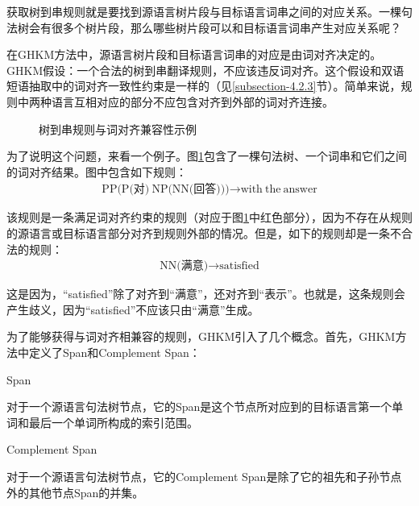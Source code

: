 \parinterval 获取树到串规则就是要找到源语言树片段与目标语言词串之间的对应关系。一棵句法树会有很多个树片段，那么哪些树片段可以和目标语言词串产生对应关系呢？

\parinterval 在GHKM方法中，源语言树片段和目标语言词串的对应是由词对齐决定的。GHKM假设：一个合法的树到串翻译规则，不应该违反词对齐。这个假设和双语短语抽取中的词对齐一致性约束是一样的（见\ref{subsection-4.2.3}节）。简单来说，规则中两种语言互相对应的部分不应包含对齐到外部的词对齐连接。

\begin{figure}[htp]
\centering

\caption{树到串规则与词对齐兼容性示例}
\label{fig:4-50}
\end{figure}

\parinterval 为了说明这个问题，来看一个例子。图\ref{fig:4-50}包含了一棵句法树、一个词串和它们之间的词对齐结果。图中包含如下规则：
\begin{eqnarray}
\textrm{PP(P(对)}\ \textrm{NP(NN(回答)))} \rightarrow \textrm{with}\ \textrm{the}\ \textrm{answer} \nonumber
\end{eqnarray}

\parinterval 该规则是一条满足词对齐约束的规则（对应于图\ref{fig:4-50}中红色部分），因为不存在从规则的源语言或目标语言部分对齐到规则外部的情况。但是，如下的规则却是一条不合法的规则：
\begin{eqnarray}
\textrm{NN(满意)} \rightarrow \textrm{satisfied} \nonumber
\end{eqnarray}

\parinterval 这是因为，``satisfied''除了对齐到``满意''，还对齐到``表示''。也就是，这条规则会产生歧义，因为``satisfied''不应该只由``满意''生成。

\parinterval 为了能够获得与词对齐相兼容的规则，GHKM引入了几个概念。首先，GHKM方法中定义了Span和Complement Span：

\vspace{0.5em}
\begin{definition} Span

{\small
对于一个源语言句法树节点，它的Span是这个节点所对应到的目标语言第一个单词和最后一个单词所构成的索引范围。
}
\end{definition}

\vspace{0.5em}
\begin{definition} Complement Span

{\small
对于一个源语言句法树节点，它的Complement Span是除了它的祖先和子孙节点外的其他节点Span的并集。
}
\end{definition}

